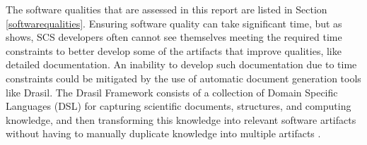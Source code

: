 \documentclass[12pt, notitlepage]{article}
\begin{document}
  The software qualities that are assessed in this report are listed in Section \ref{softwarequalities}. Ensuring software quality can take significant time, but as \cite{SmithEtAl2016} shows, SCS developers often cannot see themselves meeting the required time constraints to better develop some of the artifacts that improve qualities, like detailed documentation. An inability to develop such documentation due to time constraints could be mitigated by the use of automatic document generation tools like Drasil. The Drasil Framework consists of a collection of Domain Specific Languages (DSL) for capturing scientific documents, structures, and computing
knowledge, and then transforming this knowledge into relevant software artifacts without having to manually duplicate knowledge into multiple artifacts \citep{zhao2018}.

\newpage
\end{document}
